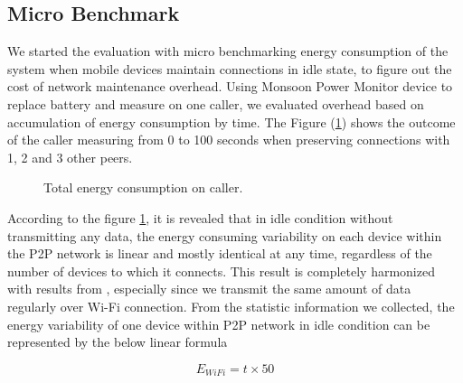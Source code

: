 \documentclass{sig-alternate}[10pt]
\begin{document}
\subsection{Micro Benchmark}
We started the evaluation with micro benchmarking energy consumption of the system when mobile devices maintain connections in idle state, to figure out the cost of network maintenance overhead. Using Monsoon Power Monitor device \cite{moosoon} to replace battery and measure on one caller, we evaluated overhead based on accumulation of energy consumption by time. The Figure (\ref{fig:microb_24}) shows the outcome of the caller measuring from 0 to 100 seconds when preserving connections with 1, 2 and 3 other peers. 

\begin{figure}
	\hspace*{-0.15cm}
	\caption{Total energy consumption on caller.}
	\label{fig:microb_24}
\end{figure}

According to the figure \ref{fig:microb_24}, it is revealed that in idle condition without transmitting any data, the energy consuming variability on each device within the P2P network is linear and mostly identical at any time, regardless of the number of devices to which it connects. This result is completely harmonized with results from \cite{wifi_energy}, especially since we transmit the same amount of data regularly over Wi-Fi connection. From the statistic information we collected, the energy variability of one device within P2P network in idle condition can be represented by the below linear formula

\begin{equation}
\label{eq:wifi_overload}
E_{WiFi} = t \times 50
\end{equation}
\end{document}
